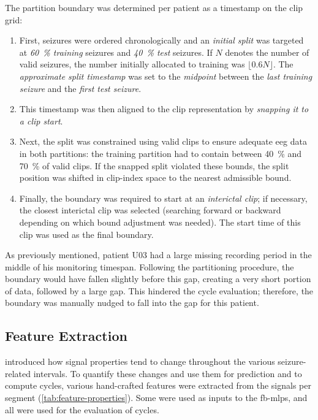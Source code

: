 The partition boundary was determined per patient as a timestamp on the clip grid:
\begin{enumerate}
    \item 
    First, seizures were ordered chronologically and an \textit{initial split} was targeted at \textit{\SI{60}{\percent} training} seizures and \textit{\SI{40}{\percent} test} seizures.
    If $N$ denotes the number of valid seizures, the number initially allocated to training was $\lfloor 0.6N \rfloor$. The \textit{approximate split timestamp} was set to the \textit{midpoint} between the \textit{last training seizure} and the \textit{first test seizure}.
    \item 
    This timestamp was then aligned to the clip representation by \textit{snapping it to a clip start}.
    \item
    Next, the split was constrained using valid clips to ensure adequate \gls{eeg} data in both partitions: the training partition had to contain between \SI{40}{\percent} and \SI{70}{\percent} of valid clips.
    If the snapped split violated these bounds, the split position was shifted in clip-index space to the nearest admissible bound.
    \item
    Finally, the boundary was required to start at an \textit{interictal clip}; if necessary, the closest interictal clip was selected (searching forward or backward depending on which bound adjustment was needed).
    The start time of this clip was used as the final boundary.
\end{enumerate}

As previously mentioned, patient U03 had a large missing recording period in the middle of his monitoring timespan.
Following the partitioning procedure, the boundary would have fallen slightly before this gap, creating a very short portion of data, followed by a large gap.
This hindered the cycle evaluation; therefore, the boundary was manually nudged to fall into the gap for this patient.


\subsection{Feature Extraction} \label{subsec:feature-extraction}

 introduced how signal properties tend to change throughout the various seizure-related intervals.
To quantify these changes and use them for prediction and to compute cycles, various hand-crafted features were extracted from the signals per segment (\cref{tab:feature-properties}).
Some were used as inputs to the \glspl{fb-mlp}, and all were used for the evaluation of cycles.

